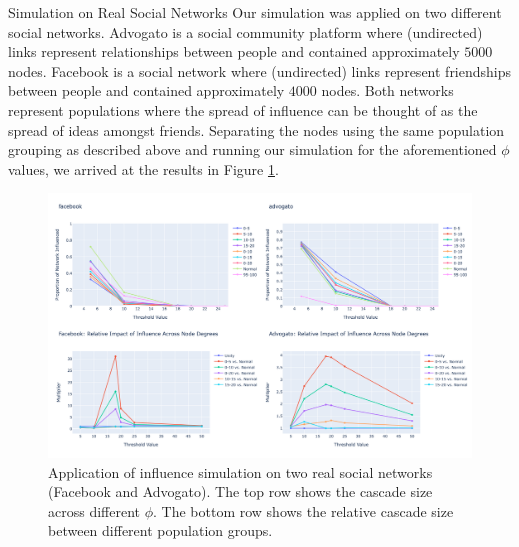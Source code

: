 \documentclass[10pt, oneside, reqno]{amsart}
\makeatletter
\theoremstyle{plain}%
\theoremstyle{definition}
\theoremstyle{remark}
\renewcommand\subsection{\@startsection{subsection}{2}%
  \z@{.5\linespacing\@plus.7\linespacing}{-.5em}%
  {\normalfont\scshape}}
\makeatother
\begin{document}
\subsection{Simulation on Real Social Networks}
Our simulation was applied on two different social networks. 
Advogato \cite{advogato} is a social community platform  where (undirected) links represent relationships between people and contained approximately $5000$ nodes. 
Facebook \cite{facebook} is a social network where (undirected) links represent friendships between people and contained approximately $4000$ nodes.
Both networks represent populations where the spread of influence can be thought of as the spread of ideas amongst friends.
Separating the nodes using the same population grouping as described above and running our simulation for the aforementioned $\phi$ values, we arrived at the results in Figure \ref{RealDat}.


\begin{figure}[ht]
    \includegraphics[scale=0.2]{Report/figs/RealDat.png}
    \caption{Application of influence simulation on two real social networks (Facebook and Advogato). The top row shows the cascade size across different $\phi$. The bottom row shows the relative cascade size between different population groups.}
    \label{RealDat}
\end{figure}
\end{document}
